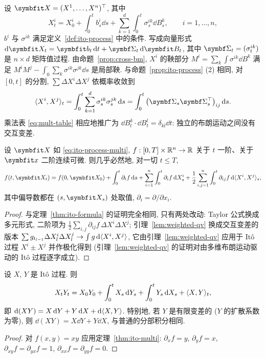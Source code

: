设 $\rvec{X}=(X^1,\dots,X^n)^\T$, 其中
\begin{equation}\label{eq:ito-process-multi}
X^i_t=X^i_0+\int_0^tb^i_s\dd s+\sum_{k=1}^d\int_0^t\sigma^{ik}_s\dd B^k_s,\qquad i=1,\dots,n,
\end{equation}
$b^i$ 与 $\sigma^{ik}$ 满足定义~\ref{def:ito-process} 中的条件. 写成向量形式 $\dd\rvec{X}_t=\rvec{b}_t\dd t+\mat{\Sigma}_t\dd\rvec{B}_t$, 其中 $\mat{\Sigma}_t=(\sigma^{ik}_t)$ 是 $n\times d$ 矩阵值过程. 由命题~\ref{prop:cross-bm}, $X^i$ 的鞅部分 $M^i=\sum_k\int\sigma^{ik}\dd B^k$ 满足 $M^iM^j-\int_0^\cdot\sum_k\sigma^{ik}\sigma^{jk}\dd s$ 是局部鞅. 与命题~\ref{prop:ito-process} (2) 相同, 对 $[0,t]$ 的分割, $\sum\Delta X^i\Delta X^j$ 依概率收敛到
\[
\ip{X^i,X^j}_t=\int_0^t\sum_{k=1}^d\sigma^{ik}_s\sigma^{jk}_s\dd s=\int_0^t\big(\mat{\Sigma}_s\mat{\Sigma}_s^\T\big)_{ij}\dd s.
\]
乘法表 \eqref{eq:mult-table} 相应地推广为 $\dd B^k_t\cdot\dd B^l_t=\delta_{kl}\dd t$: 独立的布朗运动之间没有交互变差.

\begin{theorem}[多维 It\^o 公式]\label{thm:ito-multi}
设 $\rvec{X}$ 如 \eqref{eq:ito-process-multi}, $f:[0,T]\times\mathbb{R}^n\to\mathbb{R}$ 关于 $t$ 一阶、关于 $\rvec{x}$ 二阶连续可微. 则几乎必然地, 对一切 $t\le T$,
\[
f(t,\rvec{X}_t)=f(0,\rvec{X}_0)+\int_0^t\partial_tf\dd s+\sum_{i=1}^n\int_0^t\partial_if\dd X^i_s+\frac{1}{2}\sum_{i,j=1}^n\int_0^t\partial_{ij}f\dd\ip{X^i,X^j}_s,
\]
其中偏导数都在 $(s,\rvec{X}_s)$ 处取值, $\partial_i=\partial/\partial x_i$.
\end{theorem}

\begin{proof}
与定理~\ref{thm:ito-formula} 的证明完全相同, 只有两处改动: Taylor 公式换成多元形式, 二阶项为 $\frac{1}{2}\sum_{i,j}\partial_{ij}f\,\Delta X^i\Delta X^j$; 引理~\ref{lem:weighted-qv} 换成交互变差的版本 $\sum g_{t_{l-1}}\Delta X^i_l\Delta X^j_l\to\int g\mathop{}\!\mathrm{d}\langle X^i,X^j\rangle$, 它由引理~\ref{lem:weighted-qv} 应用于 It\^o 过程 $X^i\pm X^j$ 并作极化得到 (引理~\ref{lem:weighted-qv} 的证明对由多维布朗运动驱动的 It\^o 过程逐字成立).
\end{proof}

\begin{corollary}[乘积法则]\label{cor:product-rule}
设 $X$, $Y$ 是 It\^o 过程. 则
\[
X_tY_t=X_0Y_0+\int_0^tX_s\mathop{}\!\mathrm{d} Y_s+\int_0^tY_s\mathop{}\!\mathrm{d} X_s+\langle X,Y\rangle_t,
\]
即 $\mathop{}\!\mathrm{d}(XY)=X\mathop{}\!\mathrm{d} Y+Y\mathop{}\!\mathrm{d} X+\mathop{}\!\mathrm{d}\langle X,Y\rangle$.
特别地, 若 $Y$ 是有限变差的 ($Y$ 的扩散系数为零), 则 $\dd(XY)=X\dd Y+Y\dd X$, 与普通的分部积分相同.
\end{corollary}

\begin{proof}
对 $f(x,y)=xy$ 应用定理~\ref{thm:ito-multi}: $\partial_xf=y$, $\partial_yf=x$, $\partial_{xy}f=\partial_{yx}f=1$, $\partial_{xx}f=\partial_{yy}f=0$.
\end{proof}

